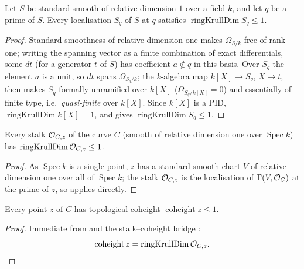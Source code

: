 \begin{lemma}
  \label{lem:adelic_relDimOne_dim_le_one}
  \leanok
  Let \(S\) be standard-smooth of relative dimension \(1\) over a field
  \(k\), and let \(q\) be a prime of \(S\). Every localisation \(S_q\)
  of \(S\) at \(q\) satisfies \(\operatorname{ringKrullDim} S_q \le 1\).
\end{lemma}
\begin{proof}
  \leanok
  Standard smoothness of relative dimension one makes \(\Omega_{S/k}\)
  free of rank one; writing the spanning vector as a finite combination
  of exact differentials, some \(dt\) (for a generator \(t\) of \(S\))
  has coefficient \(a \notin q\) in this basis. Over \(S_q\) the element
  \(a\) is a unit, so \(dt\) spans \(\Omega_{S_q/k}\); the \(k\)-algebra
  map \(k[X] \to S_q\), \(X \mapsto t\), then makes \(S_q\) formally
  unramified over \(k[X]\) (\(\Omega_{S_q/k[X]} = 0\)) and essentially
  of finite type, i.e.\ \emph{quasi-finite} over \(k[X]\). Since
  \(k[X]\) is a PID, \(\operatorname{ringKrullDim} k[X] = 1\), and
   gives
  \(\operatorname{ringKrullDim} S_q \le 1\).
\end{proof}

\begin{lemma}
  \label{lem:adelic_curve_stalk_dim_le_one}
  \leanok
  Every stalk \(\mathcal{O}_{C, z}\) of the curve \(C\) (smooth of relative
  dimension one over \(\operatorname{Spec} k\)) has
  \(\operatorname{ringKrullDim} \mathcal{O}_{C, z} \le 1\).
\end{lemma}
\begin{proof}
  \leanok
  As \(\operatorname{Spec} k\) is a single point, \(z\) has a standard
  smooth chart \(V\) of relative dimension one over all of
  \(\operatorname{Spec} k\); the stalk \(\mathcal{O}_{C, z}\) is the
  localisation of \(\Gamma(V, \mathcal{O}_{C})\) at the prime of \(z\), so
   applies directly.
\end{proof}

\begin{lemma}
  \label{lem:adelic_curve_coheight_le_one}
  \leanok
  Every point \(z\) of \(C\) has topological coheight
  \(\operatorname{coheight} z \le 1\).
\end{lemma}
\begin{proof}
  \leanok
  Immediate from  and the
  stalk--coheight bridge :
  \[
    \operatorname{coheight}z
      =\operatorname{ringKrullDim}\mathcal{O}_{C,z}.
  \]
\end{proof}

